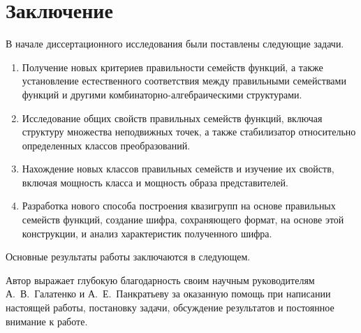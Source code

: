 \chapter*{Заключение}                       %


    В начале диссертационного исследования были поставлены следующие задачи.
    \begin{enumerate}
        \item Получение новых критериев правильности семейств функций, а также установление естественного соответствия между правильными семействами функций и другими комбинаторно-алгебраическими структурами.
        \item Исследование общих свойств правильных семейств функций, включая структуру множества неподвижных точек, а также стабилизатор относительно определенных классов преобразований.
        \item Нахождение новых классов правильных семейств и изучение их свойств, включая мощность класса и мощность образа представителей.
        \item Разработка нового способа построения квазигрупп на основе правильных семейств функций, создание шифра, сохраняющего формат, на основе этой конструкции, и анализ характеристик полученного шифра.
    \end{enumerate}
    Основные результаты работы заключаются в следующем.
    
    Автор выражает глубокую благодарность своим научным руководителям А.~В.~Галатенко и А.~Е.~Панкратьеву за оказанную помощь при написании настоящей работы, постановку задачи, обсуждение результатов и постоянное внимание к работе.
